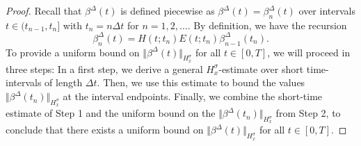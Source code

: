 \documentclass[reqno,12pt]{amsart}
\begin{document}
\begin{proof}
Recall that $\beta^\Delta(t)$ is defined piecewise as $\beta^\Delta(t) = \beta^\Delta_n(t)$ over intervals $t \in (t_{n-1},t_{n}]$ with $t_n = n\Delta t$ for $n = 1,2,\dots$. By definition, we have the recursion
\[
\beta^\Delta_n(t) = H(t;t_n)E(t;t_n) \beta^\Delta_{n-1}(t_n).
\]
To provide a uniform bound on $\Vert \beta^\Delta(t) \Vert_{H^\sigma_x}$ for all $t\in [0,T]$, we will proceed in three steps: In a first step, we derive a general $H^\sigma_x$-estimate over short time-intervals of length $\Delta t$. Then, we use this estimate to bound the values $\Vert \beta^\Delta(t_n) \Vert_{H^\sigma_x}$ at the interval endpoints. Finally, we combine the short-time estimate of Step 1 and the uniform bound on the $\Vert \beta^\Delta(t_n) \Vert_{H^\sigma_x}$ from Step 2, to conclude that there exists a uniform bound on $\Vert \beta^\Delta(t) \Vert_{H^\sigma_x}$ for all $t\in [0,T]$.


\end{proof}
\end{document}
